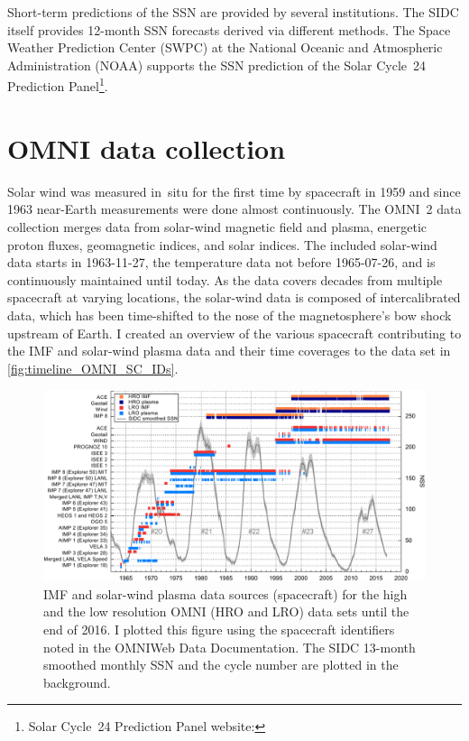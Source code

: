 Short-term predictions of the SSN are provided by several institutions. The SIDC itself provides 12-month SSN forecasts derived via different methods. The Space Weather Prediction Center (SWPC) at the National Oceanic and Atmospheric Administration (NOAA) supports the SSN prediction of the Solar Cycle~24 Prediction Panel\footnote{Solar Cycle~24 Prediction Panel website: }.


\section{OMNI data collection}
\label{sec:omni_data_collection}
Solar wind was measured in~situ for the first time by spacecraft in 1959 and since 1963 near-Earth measurements were done almost continuously. The OMNI~2 data collection \citep{King2005} merges data from solar-wind magnetic field and plasma, energetic proton fluxes, geomagnetic indices, and solar indices. The included solar-wind data starts in \mbox{1963-11-27}, the temperature data not before \mbox{1965-07-26}, and is continuously maintained until today. As the data covers decades from multiple spacecraft at varying locations, the solar-wind data is composed of intercalibrated data, which has been time-shifted to the nose of the magnetosphere's bow shock upstream of Earth. I created an overview of the various spacecraft contributing to the IMF and solar-wind plasma data and their time coverages to the data set in \autoref{fig:timeline_OMNI_SC_IDs}.
\begin{figure}[htb]
	\centering
	\includegraphics[width=\textwidth]{figures_of_mine/gnuplots/timeline_OMNI_SC_IDs.pdf}
	\caption[]
	{IMF and solar-wind plasma data sources (spacecraft) for the high and the low resolution OMNI (HRO and LRO) data sets until the end of 2016. I plotted this figure using the spacecraft identifiers noted in the OMNIWeb Data Documentation\protect\footnotemark. The SIDC 13-month smoothed monthly SSN and the cycle number are plotted in the background.}
	\label{fig:timeline_OMNI_SC_IDs}
\end{figure}

